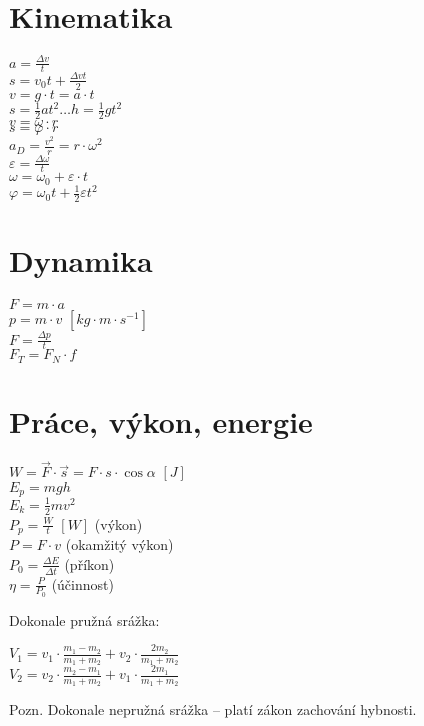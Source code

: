 \documentclass{article}
\begin{document}
\section{Kinematika}
\begin{multicols}{2}
\noindent$a=\frac{\Delta v}{t}$\\
$s=v_0t+\frac{\Delta v t}{2}$\\
$v=g\cdot t=a\cdot t$\\
$s=\frac{1}{2}at^2 \dots h=\frac{1}{2}gt^2$\\
$v=\omega \cdot r$\\
$s=\varphi \cdot r$\\
$a_D=\frac{v^2}{r}=r\cdot\omega^2$\\
$\varepsilon = \frac{\Delta \omega}{t}$\\
$\omega=\omega_0+\varepsilon\cdot t$\\
$\varphi=\omega_0t+\frac{1}{2}\varepsilon t^2$
\end{multicols}

\section{Dynamika}
\begin{multicols}{2}
\noindent $F=m\cdot a$\\
$p=m\cdot v$ $\left[kg\cdot m\cdot s^{-1}\right]$\\
$F=\frac{\Delta p}{t}$\\
$F_T=F_N\cdot f$
\end{multicols}

\section{Práce, výkon, energie}
\begin{multicols}{2}
\noindent $W=\vec{F}\cdot\vec{s}=F\cdot s \cdot \cos{\alpha}$ $[J]$\\
$E_p=mgh$\\
$E_k=\frac{1}{2}mv^2$\\
$P_p=\frac{W}{t}$ $[W]$ (výkon)\\
$P=F\cdot v$ (okamžitý výkon)\\
$P_0=\frac{\Delta E}{\Delta t}$ (příkon)\\
$\eta=\frac{P}{P_0}$ (účinnost)\\
\end{multicols}

\noindent Dokonale pružná srážka:
\begin{multicols}{2}
\noindent $V_1=v_1\cdot \frac{m_1-m_2}{m_1+m_2}+v_2\cdot \frac{2m_2}{m_1+m_2}$\\
$V_2=v_2\cdot \frac{m_2-m_1}{m_1+m_2}+v_1\cdot \frac{2m_1}{m_1+m_2}$
\end{multicols}
\noindent Pozn. Dokonale nepružná srážka -- platí zákon zachování hybnosti.
\end{document}
